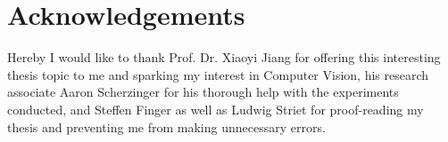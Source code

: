\chapter*{Acknowledgements}

Hereby I would like to thank Prof. Dr. Xiaoyi Jiang for offering this interesting thesis topic to me and sparking my interest in Computer Vision, his research associate Aaron Scherzinger for his thorough help with the experiments conducted, and Steffen Finger as well as Ludwig Striet for proof-reading my thesis and preventing me from making unnecessary errors.